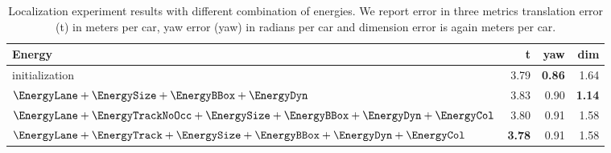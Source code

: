 
\begin{table}
  \centering
  \begin{tabular}{lrrr}
    \toprule
    Energy & t & yaw & dim \\
    \midrule
    initialization                                                                                  & 3.79 & \textbf{0.86} & 1.64 \\
    $\EnergyLane+\EnergySize+\EnergyBBox+\EnergyDyn                                       $ & 3.83 & 0.90 & \textbf{1.14} \\
    $\EnergyLane+\EnergyTrackNoOcc+\EnergySize+\EnergyBBox+\EnergyDyn+\EnergyCol $ & 3.80 & 0.91 & 1.58 \\
    $\EnergyLane+\EnergyTrack+\EnergySize+\EnergyBBox+\EnergyDyn+\EnergyCol   $ & \textbf{3.78} & 0.91 & 1.58 \\
    \bottomrule
  \end{tabular}
  \caption{Localization experiment results with different combination of energies. We report error in three metrics translation error (t) in meters per car, yaw error (yaw) in radians per car and dimension error is again meters per car.}
\end{table}


